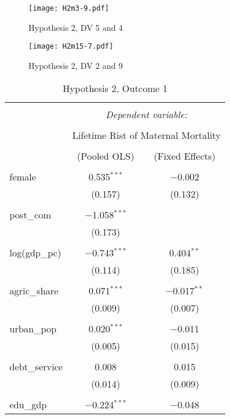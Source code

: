 \documentclass[12pt]{article}
\begin{document}
\begin{figure}[htp]
\centering
\texttt{[image: H2m3-9.pdf]}
\caption{Hypothesis 2, DV 5 and 4}
\label{fig:hypothesis 1 1-2}
\end{figure}


\begin{figure}[htp]
\centering
\texttt{[image: H2m15-7.pdf]}
\caption{Hypothesis 2, DV 2 and 9}
\label{fig:hypothesis 1 3-4}
\end{figure}


\begin{table}[!htbp] \centering 
  \caption{Hypothesis 2, Outcome 1} 
  \label{} 
\begin{tabular}{@{\extracolsep{5pt}}lcc} 
\\[-1.8ex]\hline 
\hline \\[-1.8ex] 
 & \multicolumn{2}{c}{\textit{Dependent variable:}} \\ 
\cline{2-3} 
\\[-1.8ex] & \multicolumn{2}{c}{Lifetime Rist of Maternal Mortality} \\ 
\\[-1.8ex] & (Pooled OLS) & (Fixed Effects)\\ 
\hline \\[-1.8ex] 
 female & 0.535$^{***}$ & $-$0.002 \\ 
  & (0.157) & (0.132) \\ 
  & & \\ 
 post\_com & $-$1.058$^{***}$ &  \\ 
  & (0.173) &  \\ 
  & & \\ 
 log(gdp\_pc) & $-$0.743$^{***}$ & 0.404$^{**}$ \\ 
  & (0.114) & (0.185) \\ 
  & & \\ 
 agric\_share & 0.071$^{***}$ & $-$0.017$^{**}$ \\ 
  & (0.009) & (0.007) \\ 
  & & \\ 
 urban\_pop & 0.020$^{***}$ & $-$0.011 \\ 
  & (0.005) & (0.015) \\ 
  & & \\ 
 debt\_service & 0.008 & 0.015 \\ 
  & (0.014) & (0.009) \\ 
  & & \\ 
 edu\_gdp & $-$0.224$^{***}$ & $-$0.048 \\ 

\end{tabular}
\end{table}
\end{document}
